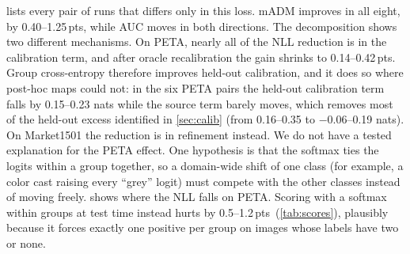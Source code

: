 \documentclass[10pt,twocolumn,letterpaper]{article}
\newcommand{\pts}{\,pts}
\begin{document}
\begin{table}[t]
\centering\small
\setlength{\tabcolsep}{2.5pt}
\caption{Group cross-entropy, eight pairs that differ only in this loss. NLL and its calibration (cal.) and refinement (ref.) terms in nats; mADM$_{\text{or}}$ is mADM after oracle recalibration; mADM and AUC in points.}
\label{tab:gce}
\end{table}

 lists every pair of runs that differs only in this loss. mADM improves in all eight, by 0.40--1.25\pts, while AUC moves in both directions. The decomposition shows two different mechanisms. On PETA, nearly all of the NLL reduction is in the calibration term, and after oracle recalibration the gain shrinks to 0.14--0.42\pts. Group cross-entropy therefore improves held-out calibration, and it does so where post-hoc maps could not: in the six PETA pairs the held-out calibration term falls by 0.15--0.23 nats while the source term barely moves, which removes most of the held-out excess identified in \cref{sec:calib} (from 0.16--0.35 to $-$0.06--0.19 nats). On Market1501 the reduction is in refinement instead. We do not have a tested explanation for the PETA effect. One hypothesis is that the softmax ties the logits within a group together, so a domain-wide shift of one class (for example, a color cast raising every ``grey'' logit) must compete with the other classes instead of moving freely.  shows where the NLL falls on PETA. Scoring with a softmax within groups at test time instead hurts by 0.5--1.2\pts\ (\cref{tab:scores}), plausibly because it forces exactly one positive per group on images whose labels have two or none.
\end{document}
